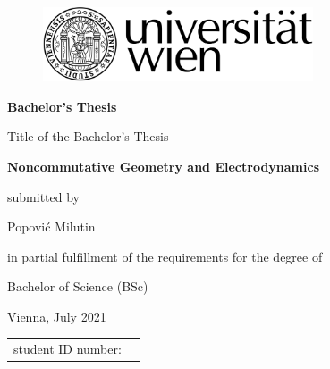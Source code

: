 \begin{titlepage}

\begin{center}
\begin{figure}
\hspace{8.8cm}
\includegraphics[width=8cm]{pics/uni_logo}
\end{figure}
\vspace*{2cm}

    \fontsize{22}{0} \selectfont \textbf{Bachelor's Thesis}\\

\vspace*{2.5cm}

\fontsize{12}{0} \selectfont Title of the Bachelor's Thesis\\

\vspace*{0.3cm}

\fontsize{18}{0} \selectfont \textbf{Noncommutative Geometry and
Electrodynamics}\\

\vspace*{1.5cm}

    {\fontsize{12}{0} \selectfont submitted by}\\
\vspace*{0.3cm}

    { \fontsize{14}{0} \selectfont Popović Milutin}\\

\vspace*{2cm}

    {\fontsize{12}{0} \selectfont  in partial fulfillment of the requirements for the degree of}\\
\vspace*{0.3cm}

    { \fontsize{14}{0} \selectfont Bachelor of Science (BSc)}\\
\vspace*{2cm}

    { \fontsize{10}{0} \selectfont Vienna, July 2021}\\

\vspace*{3.0cm}

\begin{tabular}{p{9cm}p{11.25cm}}
        \fontsize{10}{0} \selectfont
        student ID number:\vspace*{0.3cm}& \fontsize{10}{0} \selectfont 11807930\\


\end{tabular}
\end{center}
\end{titlepage}

